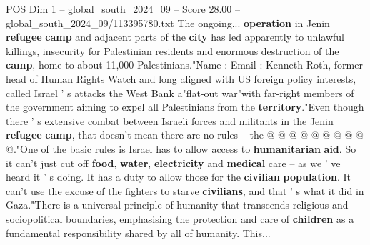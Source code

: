 \begin{textsample}{POS Dim 1 – global\_south\_2024\_09 – Score 28.00 – global\_south\_2024\_09/113395780.txt}
The ongoing... \textbf{operation} in Jenin \textbf{refugee} \textbf{camp} and adjacent parts of the \textbf{city} has led apparently to unlawful killings, insecurity for Palestinian residents and enormous destruction of the \textbf{camp}, home to about 11,000 Palestinians."Name : Email : Kenneth Roth, former head of Human Rights Watch and long aligned with US foreign policy interests, called Israel ' s attacks the West Bank a"flat-out war"with far-right members of the government aiming to expel all Palestinians from the \textbf{territory}."Even though there ' s extensive combat between Israeli forces and militants in the Jenin \textbf{refugee} \textbf{camp}, that doesn't mean there are no rules -- the @ @ @ @ @ @ @ @ @ @."One of the basic rules is Israel has to allow access to \textbf{humanitarian} \textbf{aid}.
So it can't just cut off \textbf{food}, \textbf{water}, \textbf{electricity} and \textbf{medical} care -- as we ' ve heard it ' s doing.
It has a duty to allow those for the \textbf{civilian} \textbf{population}.
It can't use the excuse of the fighters to starve \textbf{civilians}, and that ' s what it did in Gaza."There is a universal principle of humanity that transcends religious and sociopolitical boundaries, emphasising the protection and care of \textbf{children} as a fundamental responsibility shared by all of humanity.
This...

\end{textsample}
